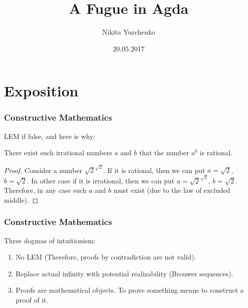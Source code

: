 \documentclass[xetex]{beamer}
\title[A Fugue in Agda]{A Fugue in Agda}
\author{Nikita Yurchenko}
\institute{NURE}
\date{20.05.2017}
\begin{document}
\begin{frame}
  \titlepage
\end{frame}
\begin{frame}
  \tableofcontents
\end{frame}

\section{Exposition}

\begin{frame}

  \frametitle{Constructive Mathematics}
    
  LEM if false, and here is why:

  \begin{theorem}
    There exist such irrational numbers $a$ and $b$ that
    the number $a^b$ is rational.
  \end{theorem}
  \begin{proof}
   Consider a number $\sqrt{2}^\sqrt{2}$.
   If it is rational, then we can put $a = \sqrt{2}$, $b = \sqrt{2}$.
   In other case if it is irrational, then we can put $a = \sqrt{2}^\sqrt{2}$,  $b = \sqrt{2}$.
    Therefore, in any case such $a$ and $b$ must exist (due to the law of excluded middle).
    
  \end{proof}
  
\end{frame}

\begin{frame}
  \frametitle{Constructive Mathematics}

  Three dogmas of intuitionism:
  \begin{enumerate}
  \item No LEM (Therefore, proofs by contradiction are not valid).
  \item Replace actual infinity with potential realizability (Brouwer sequences).
  \item Proofs are mathematical objects. To prove something means to construct a proof of it.
  \end{enumerate}
\end{frame}
\end{document}
